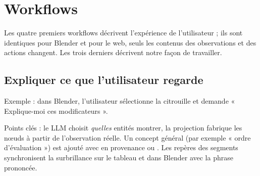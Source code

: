 \section{Workflows}

Les quatre premiers workflows décrivent l'expérience de l'utilisateur ; ils sont identiques pour Blender et pour le web, seuls les contenus des observations et des actions changent. Les trois derniers décrivent notre façon de travailler.


\subsection{Expliquer ce que l'utilisateur regarde}

Exemple : dans Blender, l'utilisateur sélectionne la citrouille et demande « Explique-moi ces modificateurs ».

\begin{center}
\end{center}

Points clés : le LLM choisit \emph{quelles} entités montrer, la projection fabrique les nœuds à partir de l'observation réelle. Un concept général (par exemple « ordre d'évaluation ») est ajouté avec  en provenance \pinf{} ou \pill. Les repères des segments synchronisent la surbrillance sur le tableau et dans Blender avec la phrase prononcée.

